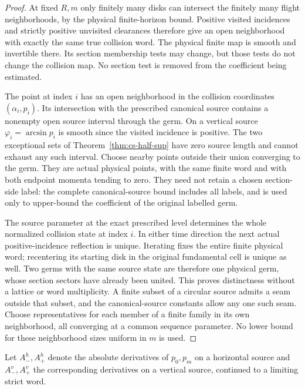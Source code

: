 \begin{proof}
At fixed $R,m$ only finitely many disks can intersect the finitely
many flight neighborhoods, by the physical finite-horizon bound.
Positive visited incidences and strictly positive unvisited
clearances therefore give an open neighborhood with exactly the
same true collision word. The physical finite map is smooth and
invertible there. Its section membership tests may change, but
those tests do not change the collision map. No section test is
removed from the coefficient being estimated.

The point at index $i$ has an open neighborhood in the collision
coordinates $(\alpha_i,p_i)$. Its intersection with the prescribed
canonical source contains a nonempty open source interval through
the germ. On a vertical source $\varphi_i=\arcsin p_i$ is smooth
since the visited incidence is positive. The two exceptional sets
of Theorem~\ref{thm:cs-half-sup} have zero source length and cannot
exhaust any such interval. Choose nearby points outside their union
converging to the germ. They are actual physical points, with the
same finite word and with both endpoint momenta tending to zero.
They need not retain a chosen section-side label: the complete
canonical-source bound includes all labels, and is used only to
upper-bound the coefficient of the original labelled germ.

The source parameter at the exact prescribed level determines the
whole normalized collision state at index $i$. In either time
direction the next actual positive-incidence reflection is unique.
Iterating fixes the entire finite physical word; recentering its
starting disk in the original fundamental cell is unique as well.
Two germs with the same source state are therefore one physical
germ, whose section sectors have already been united. This proves
distinctness without a lattice or word multiplicity. A finite
subset of a circular source admits a seam outside that subset,
and the canonical-source constants allow any one such seam.
Choose representatives for each member of a finite family in its
own neighborhood, all converging at a common sequence parameter.
No lower bound for these neighborhood sizes uniform in $m$ is used.
\end{proof}

Let $A_-^h,A_+^h$ denote the absolute derivatives of $p_0,p_m$
on a horizontal source and $A_-^v,A_+^v$ the corresponding
derivatives on a vertical source, continued to a limiting strict word.

